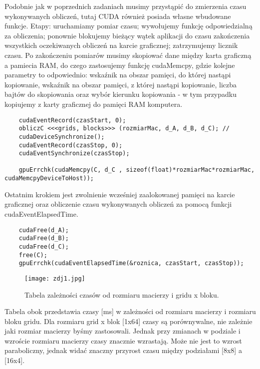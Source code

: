 \documentclass[a4paper,12pt]{article}
\begin{document}
Podobnie jak w poprzednich zadaniach musimy przystąpić do zmierzenia czasu wykonywanych obliczeń, tutaj CUDA również posiada własne wbudowane funkcje. Etapy: uruchamiamy pomiar czasu; wywołujemy funkcję odpowiedzialną za obliczenia; ponownie blokujemy bieżący wątek aplikacji do czasu zakończenia wszystkich oczekiwanych obliczeń na karcie graficznej; zatrzymujemy licznik czasu. Po zakończeniu pomiarów musimy skopiować dane między karta graficzną a pamiecia RAM, do czego zastosujemy funkcję cudaMemcpy, gdzie kolejne parametry to odpowiednio: wskaźnik na obszar pamięci, do której nastąpi kopiowanie, wskaźnik na obszar pamięci, z której nastąpi kopiowanie, liczba bajtów do skopiowania oraz wybór kierunku kopiowania - w tym przypadku kopiujemy z karty graficznej do pamięci RAM komputera.
\begin{lstlisting}
	cudaEventRecord(czasStart, 0);
	obliczC <<<grids, blocks>>> (rozmiarMac, d_A, d_B, d_C); // 
	cudaDeviceSynchronize(); 
	cudaEventRecord(czasStop, 0);
	cudaEventSynchronize(czasStop); 
	
	gpuErrchk(cudaMemcpy(C, d_C , sizeof(float)*rozmiarMac*rozmiarMac, cudaMemcpyDeviceToHost));
\end{lstlisting}
Ostatnim krokiem jest zwolnienie wcześniej zaalokowanej pamięci na karcie graficznej oraz obliczenie czasu wykonywanych obliczeń za pomocą funkcji cudaEventElapsedTime.
\begin{lstlisting}
	cudaFree(d_A);
	cudaFree(d_B);
	cudaFree(d_C);	
	free(C); 	
	gpuErrchk(cudaEventElapsedTime(&roznica, czasStart, czasStop));
\end{lstlisting}
\begin{wrapfigure}{r}{0.5\textwidth}
	\vspace{-40pt}
	\begin{center}
		\texttt{[image: zdj1.jpg]}
	\end{center}
	\vspace{-20pt}
	\caption{Tabela zależności czasów od rozmiaru macierzy i gridu x bloku.}
	\vspace{25pt}
\end{wrapfigure}

Tabela obok przedstawia czasy [ms] w zależności od rozmiaru macierzy i rozmiaru bloku gridu. Dla rozmiaru grid x blok [1x64] czasy są porównywalne, nie zależnie jaki rozmiar macierzy byśmy zastosowali. Jednak przy zmianach w podziale i wzroście rozmiaru macierzy czasy znacznie wzrastają. Może nie jest to wzrost paraboliczny, jednak widać znaczny przyrost czasu między podziałami [8x8] a [16x4].
\end{document}
